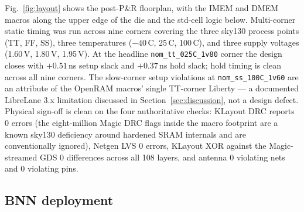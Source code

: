 \documentclass[conference]{IEEEtran}
\begin{document}
Fig.~\ref{fig:layout} shows the post-P\&R floorplan, with the IMEM
and DMEM macros along the upper edge of the die and the std-cell logic
below. Multi-corner static timing was run across nine corners covering
the three sky130 process points (TT, FF, SS), three temperatures
($-40$\,\textdegree{}C, 25\,\textdegree{}C, 100\,\textdegree{}C), and
three supply voltages (1.60\,V, 1.80\,V, 1.95\,V). At the headline
\texttt{nom\_tt\_025C\_1v80} corner the design closes with
$+0.51$\,ns setup slack and $+0.37$\,ns hold slack; hold timing is
clean across all nine corners. The slow-corner setup violations at
\texttt{nom\_ss\_100C\_1v60} are an attribute of the OpenRAM macros'
single TT-corner Liberty --- a documented LibreLane 3.x limitation
discussed in Section~\ref{sec:discussion}, not a design defect.
Physical sign-off is clean on the four authoritative checks: KLayout
DRC reports 0 errors (the eight-million Magic DRC flags inside the
macro footprint are a known sky130 deficiency around hardened SRAM
internals and are conventionally ignored), Netgen LVS 0 errors,
KLayout XOR against the Magic-streamed GDS 0 differences across all
108 layers, and antenna 0 violating nets and 0 violating pins.

\subsection{BNN deployment}
\label{sec:impl:bnn}
\end{document}
